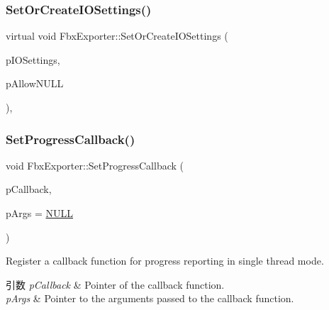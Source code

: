 \subsubsection{\texorpdfstring{Set\+Or\+Create\+I\+O\+Settings()}{SetOrCreateIOSettings()}}
{\footnotesize\ttfamily virtual void Fbx\+Exporter\+::\+Set\+Or\+Create\+I\+O\+Settings (\begin{DoxyParamCaption}\item[{\hyperlink{class_fbx_i_o_settings}{Fbx\+I\+O\+Settings} $\ast$}]{p\+I\+O\+Settings,  }\item[{bool}]{p\+Allow\+N\+U\+LL }\end{DoxyParamCaption})\hspace{0.3cm}{\ttfamily [protected]}, {\ttfamily [virtual]}}

\mbox{\label{class_fbx_exporter_a37b5449c65be8b77eae754fb52da3c1c}} 
\subsubsection{\texorpdfstring{Set\+Progress\+Callback()}{SetProgressCallback()}}
{\footnotesize\ttfamily void Fbx\+Exporter\+::\+Set\+Progress\+Callback (\begin{DoxyParamCaption}\item[{\hyperlink{fbxprogress_8h_a3765040904b462fb1f2673caba3488db}{Fbx\+Progress\+Callback}}]{p\+Callback,  }\item[{void $\ast$}]{p\+Args = {\ttfamily \hyperlink{fbxarch_8h_a070d2ce7b6bb7e5c05602aa8c308d0c4}{N\+U\+LL}} }\end{DoxyParamCaption})}

Register a callback function for progress reporting in single thread mode. 
\begin{DoxyParams}{引数}
{\em p\+Callback} & Pointer of the callback function. \\
\hline
{\em p\+Args} & Pointer to the arguments passed to the callback function. \\
\hline
\end{DoxyParams}
\mbox{\label{class_fbx_exporter_aeea95b702891fa350a03ab3e9aa949e1}} 
